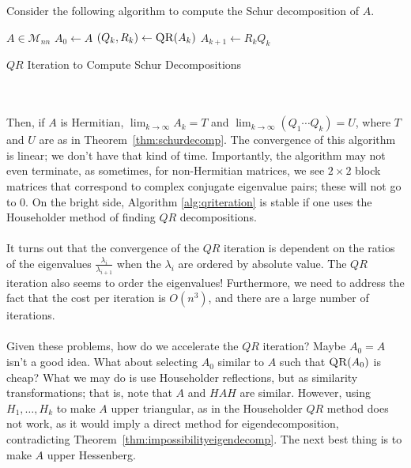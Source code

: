         Consider the following algorithm to compute the Schur decomposition of \(A\).
        \begin{algorithm}[H]
            \begin{algorithmic}[1]
                \Require \(A\in\mathcal{M}_{nn}\) 
                    \State \(A_0\gets A\)
                        \State \((Q_k,R_k)\gets \Call{QR}{A_k}\)
                        \State \(A_{k+1}\gets R_kQ_k\) 
                    \EndWhile
                \EndProcedure 
            \end{algorithmic}
            \caption{\(QR\) Iteration to Compute Schur Decompositions}
            \label{alg:qriteration}
        \end{algorithm}
        \vphantom
        \\
        \\
        Then, if \(A\) is Hermitian, \(\lim_{k\to\infty}A_k=T\) and \(\lim_{k\to\infty}(Q_1\cdots Q_k)=U\), where \(T\) and \(U\) are as in Theorem~\ref{thm:schurdecomp}. The convergence of this algorithm is linear; we don't have that kind of time. Importantly, the algorithm may not even terminate, as sometimes, for non-Hermitian matrices, we see \(2\times 2\) block matrices that correspond to complex conjugate eigenvalue pairs; these will not go to \(0\). On the bright side, Algorithm \ref{alg:qriteration} is stable if one uses the Householder method of finding \(QR\) decompositions.
        \\
        \\
        It turns out that the convergence of the \(QR\) iteration is dependent on the ratios of the eigenvalues \(\frac{\lambda_i}{\lambda_{i+1}}\) when the \(\lambda_i\) are ordered by absolute value. The \(QR\) iteration also seems to order the eigenvalues! Furthermore, we need to address the fact that the cost per iteration is \(O(n^3)\), and there are a large number of iterations.
        \\
        \\
        Given these problems, how do we accelerate the \(QR\) iteration? Maybe \(A_0=A\) isn't a good idea. What about selecting \(A_0\) similar to \(A\) such that \(\textsc{QR}(A_0)\) is cheap? What we may do is use Householder reflections, but as similarity transformations; that is, note that \(A\) and \(HAH\) are similar. However, using \(H_1,\ldots,H_k\) to make \(A\) upper triangular, as in the Householder \(QR\) method does not work, as it would imply a direct method for eigendecomposition, contradicting Theorem~\ref{thm:impossibilityeigendecomp}. The next best thing is to make \(A\) upper Hessenberg.
